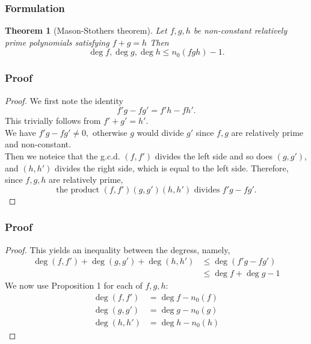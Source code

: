 \documentclass[envcountsect]{beamer}
\newtheorem*{theorem*}{Theorem}
\begin{document}
\begin{frame}
\frametitle{Formulation}

\begin{theorem*}[Mason-Stothers theorem]
Let $f,g,h$ be non-constant relatively prime polynomials satisfying $f+g=h$
Then \[\operatorname{deg}f, \operatorname{deg}g, \operatorname{deg}h \leq
  n_0(fgh) -1.\]
\end{theorem*}

\end{frame}

\begin{frame}
  \frametitle{Proof}
  \begin{proof}\let\qed\relax
    We first note the identity
    \[
      f'g - fg' = f'h - fh'.
    \]
    This trivially follows from $f'+g' = h'.$ \\
    We have $f'g - fg' \neq 0,$
    otherwise $g$ would divide $g'$ since $f,g$ are relatively prime and non-constant. \\
    Then we noteice that the g.c.d. $(f, f')$ divides the left side and so does
    $(g,g')$, and $(h,h')$ divides the right side, which is equal to the left
    side. Therefore, since $f,g,h$ are relatively prime,
    $$
      \text{the product } (f,f')(g,g')(h,h') \text{ divides } f'g - fg'.
    $$

  \end{proof}
\end{frame}

\begin{frame}
  \frametitle{Proof}
  \begin{proof}\let\qed\relax
    This yields an inequality between the degress, namely,
    \begin{align} 
      \operatorname{deg}(f,f') + \operatorname{deg}(g,g') + \operatorname{deg}(h,h') &\leq
      \operatorname{deg}(f'g - fg') \label{ineq} \\ 
      &\leq \operatorname{deg}f + \operatorname{deg}g - 1 \nonumber
    \end{align}
    We now use Proposition 1 for each of $f,g,h:$
    \begin{align*}
      \operatorname{deg}(f,f') &= \operatorname{deg}f - n_0(f) \\
      \operatorname{deg}(g,g') &= \operatorname{deg}g - n_0(g) \\
      \operatorname{deg}(h,h') &= \operatorname{deg}h - n_0(h)
    \end{align*}
    \end{proof}


\end{frame}
\end{document}
